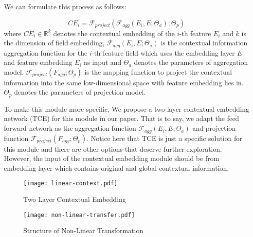 \documentclass[sigconf]{acmart}
\begin{document}
 We can formulate this process as  follows:

\begin{equation}
  CE_i = \mathcal{F}_{project}(\mathcal{F}_{agg}(E_i, E; \Theta_a); \Theta_p)
\end{equation}
where  $CE_i \in \mathbb{R}^k$ denotes the contextual embedding of the $i$-th feature $E_i$ and $k$ is the dimension of field embedding, $\mathcal{F}_{agg}(E_i, E; \Theta_a)$ is the contextual information aggregation function for the $i$-th feature field which uses the embedding layer $E$ and feature embedding $E_i$ as input and $\Theta_a$ denotes the parameters of aggregation model. $\mathcal{F}_{project}(F_{agg}; \Theta_p)$ is the mapping function to project the contextual information into the same low-dimensional space with feature embedding lies in. $\Theta_p$ denotes the parameters of projection model.


To make this module more specific, We propose a  two-layer contextual embedding network (TCE) for this module in our paper. That is to say, we adapt the feed forward network as the aggregation function $\mathcal{F}_{agg}(E_i, E; \Theta_a)$ and projection function $\mathcal{F}_{project}(F_{agg}; \Theta_p)$. Notice here that TCE is just a specific solution for this module and there are other options  that deserve further exploration. However, the input of the contextual embedding module should be from embedding layer which contains original and global contextual information.






\begin{figure}
\begin{minipage}[t]{0.49\linewidth}
  \centering
  \texttt{[image: linear-context.pdf]}
  \caption{Two Layer  Contextual Embedding}
  \label{fig:linearcontext}
\end{minipage}\begin{minipage}[t]{0.49\linewidth}
  \centering
  \texttt{[image: non-linear-transfer.pdf]}
  \caption{Structure of Non-Linear Transformation}
  \label{fig:transfer}
\end{minipage}
\end{figure}
\end{document}

